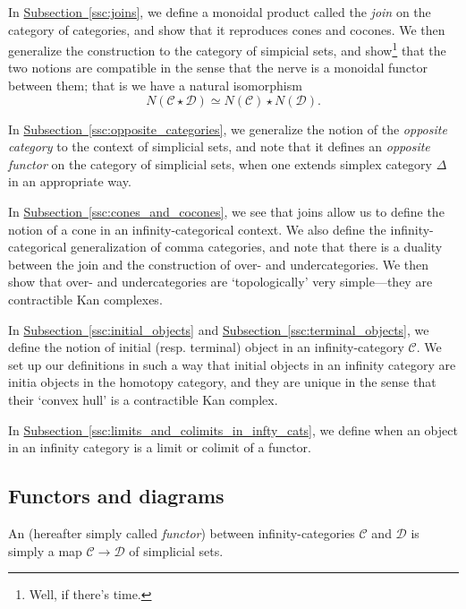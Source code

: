 \documentclass[main.tex]{subfiles}
\begin{document}
In \hyperref[ssc:joins]{Subsection~\ref*{ssc:joins}}, we define a monoidal product called the \emph{join} on the category of categories, and show that it reproduces cones and cocones. We then generalize the construction to the category of simpicial sets, and show\footnote{Well, if there's time.} that the two notions are compatible in the sense that the nerve is a monoidal functor between them; that is we have a natural isomorphism
\begin{equation*}
  N(\mathcal{C} \star \mathcal{D}) \simeq N(\mathcal{C}) \star N(\mathcal{D}).
\end{equation*}

In \hyperref[ssc:opposite_categories]{Subsection~\ref*{ssc:opposite_categories}}, we generalize the notion of the \emph{opposite category} to the context of simplicial sets, and note that it defines an \emph{opposite functor} on the category of simplicial sets, when one extends simplex category $\Delta$ in an appropriate way.

In \hyperref[ssc:cones_and_cocones]{Subsection~\ref*{ssc:cones_and_cocones}}, we see that joins allow us to define the notion of a cone in an infinity-categorical context. We also define the infinity-categorical generalization of comma categories, and note that there is a duality between the join and the construction of over- and undercategories. We then show that over- and undercategories are `topologically' very simple---they are contractible Kan complexes.

In \hyperref[ssc:initial_objects]{Subsection~\ref*{ssc:initial_objects}} and \hyperref[ssc:terminal_objects]{Subsection~\ref*{ssc:terminal_objects}}, we define the notion of initial (resp. terminal) object in an infinity-category $\mathcal{C}$. We set up our definitions in such a way that initial objects in an infinity category are initia objects in the homotopy category, and they are unique in the sense that their `convex hull' is a contractible Kan complex.

In \hyperref[ssc:limits_and_colimits_in_infty_cats]{Subsection~\ref*{ssc:limits_and_colimits_in_infty_cats}}, we define when an object in an infinity category is a limit or colimit of a functor.

\subsection{Functors and diagrams}
\label{ssc:functors_and_diagrams}

\begin{definition}
  \label{def:infinity_functor}
  An  (hereafter simply called \emph{functor}) between infinity-categories $\mathcal{C}$ and $\mathcal{D}$ is simply a map $\mathcal{C} \to \mathcal{D}$ of simplicial sets.
\end{definition}
\end{document}
